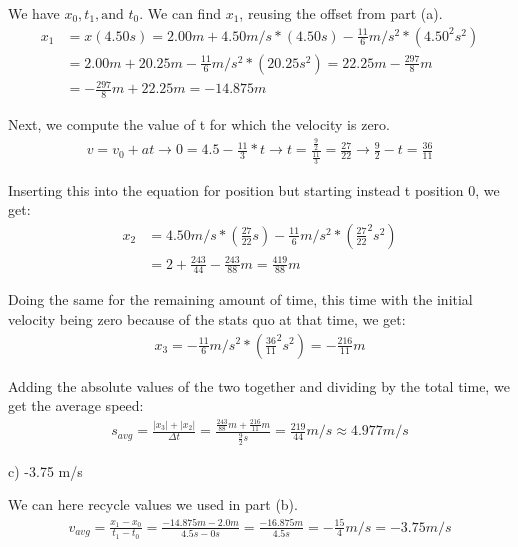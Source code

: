 \documentclass[12pt]{article}
\begin{document}
We have $x_0, t_1,\text{and }t_0$. We can find $x_1$, reusing the offset from part (a).
\begin{align*}
    x_1 &= x(4.50\unit{s}) = 2.00 \unit{m} + 4.50\unit{m/s}*(4.50\unit{s}) - \frac{11}{6}\unit{m/s^2}*(4.50^2\unit{s}^2) \\
        &= 2.00 \unit{m} + 20.25 \unit{m} - \frac{11}{6}\unit{m/s^2}*(20.25\unit{s}^2) = 22.25\unit{m} - \frac{297}{8} \unit{m} \\
        &= -\frac{297}{8}\unit{m} + 22.25\unit{m} = -14.875\unit{m}
\end{align*}

Next, we compute the value of t for which the velocity is zero.
\begin{align*}
    v = v_0 + at \rightarrow
    0 = 4.5 - \frac{11}{3} * t \rightarrow
    t = \frac{\frac{9}{2}}{\frac{11}{3}} = \frac{27}{22}\rightarrow
    \frac{9}{2} - t = \frac{36}{11}
\end{align*}

Inserting this into the equation for position but starting instead t position 0, we get:
\begin{align*}
    x_2 &= 4.50\unit{m/s}*(\frac{27}{22}\unit{s}) - \frac{11}{6}\unit{m/s^2}*(\frac{27}{22}^2\unit{s}^2)\\
        &= 2 + \frac{243}{44} - \frac{243}{88} \unit{m} = \frac{419}{88} \unit{m}
\end{align*}

Doing the same for the remaining amount of time, this time with the initial velocity being zero because of the stats quo at that time, we get:
\begin{align*}
    x_3 = -\frac{11}{6}\unit{m/s^2}*(\frac{36}{11}^2\unit{s}^2) = -\frac{216}{11} \unit{m}
\end{align*}

Adding the absolute values of the two together and dividing by the total time, we get the average speed:
\begin{align*}
    s_{avg} = \frac{|x_3| + |x_2|}{\Delta t} = \frac{\frac{243}{88}\unit{m} + \frac{216}{11}\unit{m}}{\frac{9}{2}\unit{s}} = \boxed{\frac{219}{44} \unit{m/s} \approx 4.977\unit{m/s}}
\end{align*}

c) -3.75 m/s

We can here recycle values we used in part (b). 
\begin{align*}
    v_{avg} = \frac{x_1 - x_0}{t_1 - t_0} = \frac{-14.875\unit{m} - 2.0\unit{m}}{4.5\unit{s} - 0\unit{s}} = \frac{-16.875\unit{m}}{4.5\unit{s}} = \boxed{-\frac{15}{4} \unit{m/s} = -3.75 \unit{m/s}}
\end{align*}
\end{document}
